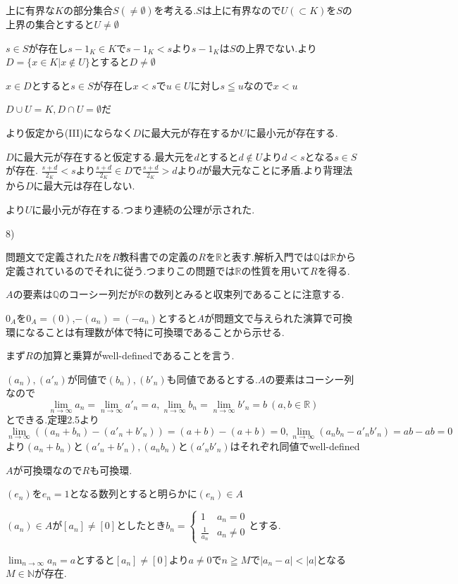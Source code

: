 \documentclass{jsarticle}
\begin{document}
 上に有界な$K$の部分集合$S(\neq\emptyset)$を考える.$S$は上に有界なので$U(\subset K)$を$S$の上界の集合とすると$U\neq \emptyset$
 
 $s\in S$が存在し$s-1_K\in K$で$s-1_K< s$より$s-1_K$は$S$の上界でない.より$D=\{x\in K|x\notin U\}$とすると$D\neq \emptyset$
 
 $x\in D$とすると$s\in S$が存在し$x < s$で$u\in U$に対し$s\leqq u$なので$x < u$
 
 $D\cup U = K,D\cap U=\emptyset$だ
 
 より仮定から(III)にならなく$D$に最大元が存在するか$U$に最小元が存在する.
 
 $D$に最大元が存在すると仮定する.最大元を$d$とすると$d\notin U$より$d < s$となる$s\in S$が存在.
 $\frac{s+d}{2_K}<s$より$\frac{s+d}{2_K}\in D$で$\frac{s+d}{2_K}>d$より$d$が最大元なことに矛盾.より背理法から$D$に最大元は存在しない.
 
 より$U$に最小元が存在する.つまり連続の公理が示された.

8)

問題文で定義された$R$を$R$教科書での定義の$R$を$\mathbb{R}$と表す.解析入門では$\mathbb{Q}$は$\mathbb{R}$から定義されているのでそれに従う.つまりこの問題では$\mathbb{R}$の性質を用いて$R$を得る.

$A$の要素は$\mathbb{Q}$のコーシー列だが$\mathbb{R}$の数列とみると収束列であることに注意する.

$0_A$を$0_A=(0)$,$-(a_n)=(-a_n)$とすると$A$が問題文で与えられた演算で可換環になることは有理数が体で特に可換環であることから示せる.

まず$R$の加算と乗算がwell-definedであることを言う.

$(a_n),(a'_n)$が同値で$(b_n),(b'_n)$も同値であるとする.$A$の要素はコーシー列なので
\[\lim_{n\to\infty}a_n=\lim_{n\to\infty}a'_n=a,\lim_{n\to\infty}b_n=\lim_{n\to\infty}b'_n=b \ (a,b\in\mathbb{R})\]
とできる.定理2.5より
\[\lim_{n\to\infty}((a_n+b_n)-(a'_n+b'_n))=(a+b)-(a+b)=0,\lim_{n\to\infty}(a_nb_n-a'_nb'_n)=ab-ab=0\]
より$(a_n+b_n)$と$(a'_n+b'_n),(a_nb_n)$と$(a'_nb'_n)$はそれぞれ同値でwell-defined

$A$が可換環なので$R$も可換環.

$(e_n)$を$e_n=1$となる数列とすると明らかに$(e_n)\in A$

$(a_n) \in A$が$[a_n]\neq [0]$としたとき$b_n=\begin{cases}
1 & a_n = 0\\
\frac{1}{a_n} & a_n\neq 0
\end{cases}$とする.

$\displaystyle \lim_{n\to\infty}a_n=a$とすると$[a_n]\neq [0]$より$a\neq 0$で$n\geqq M$で$|a_n-a|<|a|$となる$M\in\mathbb{N}$が存在.
\end{document}
